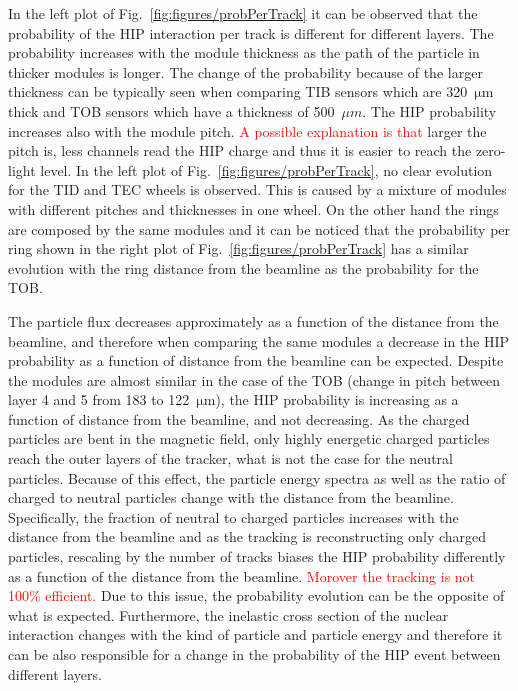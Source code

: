 In the left plot of Fig.~\ref{fig:figures/probPerTrack} it can be observed that the probability of the HIP interaction per track is different for different layers. The probability increases with the module thickness as the path of the particle in thicker modules is longer. The change of the probability because of the larger thickness can be typically seen when comparing TIB sensors which are 320~$\mathrm{\mu m}$ thick and TOB sensors which have a thickness of 500~$\mu m$. The HIP probability increases also with the module pitch. \textcolor{red}{A possible explanation is that} larger the pitch is, less channels read the HIP charge and thus it is easier to reach the zero-light level. In the left plot of Fig.~\ref{fig:figures/probPerTrack}, no clear evolution for the TID and TEC wheels is observed. This is caused by a mixture of modules with different pitches and thicknesses in one wheel. On the other hand the rings are composed by the same modules and it can be noticed that the probability per ring shown in the right plot of Fig.~\ref{fig:figures/probPerTrack} has a similar evolution with the ring distance from the beamline as the probability for the TOB. 

The particle flux decreases approximately as a function of the distance from the beamline, and therefore when comparing the same modules a decrease in the HIP probability as a function of distance from the beamline can be expected. Despite the modules are almost similar in the case of the TOB (change in pitch between layer 4 and 5 from 183 to 122~$\mathrm{\mu m}$), the HIP probability is increasing as a function of distance from the beamline, and not decreasing. As the charged particles are bent in the magnetic field, only highly energetic charged particles reach the outer layers of the tracker, what is not the case for the neutral particles. Because of this effect, the particle energy spectra as well as the ratio of charged to neutral particles change with the distance from the beamline. Specifically, the fraction of neutral to charged particles increases with the distance from the beamline and as the tracking is reconstructing only charged particles, rescaling by the number of tracks biases the HIP probability differently as a function of the distance from the beamline. \textcolor{red}{Morover the tracking is not 100\% efficient. } Due to this issue, the probability evolution can be the opposite of what is expected. Furthermore, the inelastic cross section of the nuclear interaction changes with the kind of particle and particle energy and therefore it can be also responsible for a change in the probability of the HIP event between different layers.  


